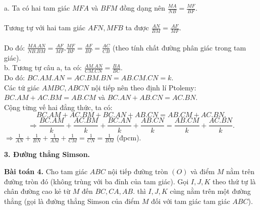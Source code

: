 \documentclass[12pt,a4paper]{article}
\begin{document}
a. Ta có hai tam giác \(MFA\) và \(BFM\) đồng dạng nên \(\frac{{MA}}{{NB}} = \frac{{MF}}{{BF}}.\)\\
\\
Tương tự với hai tam giác \(AFN,MFB\) ta được \(\frac{{AN}}{{BM}} = \frac{{AF}}{{MF}}.\)\\
\\
Do đó: \(\frac{{MA.AN}}{{NB.BM}} = \frac{{AF}}{{MF}}.\frac{{MF}}{{BF}} = \frac{{AF}}{{BF}} = \frac{{AC}}{{CB}}\) (theo tính chất đường phân giác trong tam giác).\\
b. Tương tự câu a, ta có: \(\frac{{AM.AN}}{{CM.CN}} = \frac{{BA}}{{BC}}.\)\\
Do đó: \(BC.AM.AN = AC.BM.BN = AB.CM.CN = k.\)\\
Các tứ giác \(AMBC,ABCN\) nội tiếp nên theo định lí Ptolemy:\\
\(BC.AM + AC.BM = AB.CM\) và \(BC.AN + AB.CN = AC.BN.\)\\
Cộng từng vế hai đẳng thức, ta có:\\
\[BC.AM + AC.BM + BC.AN + AB.CN = AB.CM + AC.BN.\]
\[ \Rightarrow \frac{{BC.AM}}{k} + \frac{{AC.BM}}{k} + \frac{{BC.AN}}{k} + \frac{{AB.CN}}{k} = \frac{{AB.CM}}{k} + \frac{{AC.BN}}{k}.\]
\( \Rightarrow \frac{1}{{AN}} + \frac{1}{{BN}} + \frac{1}{{AM}} + \frac{1}{{CM}} = \frac{1}{{CN}} = \frac{1}{{BM}}\) (đpcm).
\newpage
\begin{center}
\fontsize{16}{16}\selectfont
\textbf{3. Đường thẳng Simson.}
\end{center}
\textbf{Bài toán 4.} Cho tam giác \(ABC\) nội tiếp đường tròn \(\left( O \right)\) và điểm \(M\) nằm trên đường tròn đó (không trùng với ba đỉnh của tam giác). Gọi \(I,J,K\) theo thứ tự là chân đường cao kẻ từ \(M\) đến \(BC,CA,AB.\) thì \(I,J,K\) cùng nằm trên một đường thẳng (gọi là đường thẳng Simson của điểm \(M\) đối với tam giác tam giác \(ABC\)). 
\end{document}
